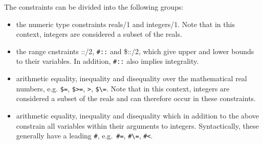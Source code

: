 The constraints can be divided into the following groups:
\begin{itemize}
\item the numeric type constraints reals/1 and integers/1.
    Note that in this context, integers are considered a subset of the reals.

\item the range cnstraints ::/2, \verb'#::' and \$::/2, which give upper
    and lower bounds to their variables.
    In addition, \verb'#::' also implies integrality.

\item arithmetic equality, inequality and disequality over the mathematical
    real numbers, e.g.
    \verb'$=', \verb'$>=', \verb'>', \verb'$\='.
    Note that in this context,
    integers are considered a subset of the reals and can therefore
    occur in these constraints.

\item arithmetic equality, inequality and disequality which in addition to
    the above constrain all variables within their arguments to integers.
    Syntactically, these generally have a leading \verb'#',
    e.g.\ \verb'#=', \verb'#\=', \verb'#<'.
\end{itemize}


